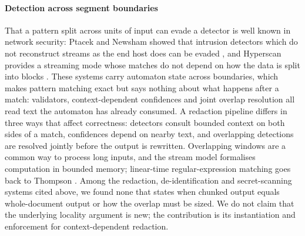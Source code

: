 \paragraph{Detection across segment boundaries}
That a pattern split across units of input can evade a detector is well known in network security: Ptacek and Newsham showed that intrusion detectors which do not reconstruct streams as the end host does can be evaded \cite{ptacek1998insertion}, and Hyperscan \cite{wang2019hyperscan} provides a streaming mode whose matches do not depend on how the data is split into blocks \cite{intel2019hyperscanintro}. These systems carry automaton state across boundaries, which makes pattern matching exact but says nothing about what happens after a match: validators, context-dependent confidences and joint overlap resolution all read text the automaton has already consumed. A redaction pipeline differs in three ways that affect correctness: detectors consult bounded context on both sides of a match, confidences depend on nearby text, and overlapping detections are resolved jointly before the output is rewritten. Overlapping windows are a common way to process long inputs, and the stream model \cite{muthukrishnan2005streams} formalises computation in bounded memory; linear-time regular-expression matching goes back to Thompson \cite{thompson1968regex}. Among the redaction, de-identification and secret-scanning systems cited above, we found none that states when chunked output equals whole-document output or how the overlap must be sized. We do not claim that the underlying locality argument is new; the contribution is its instantiation and enforcement for context-dependent redaction.
